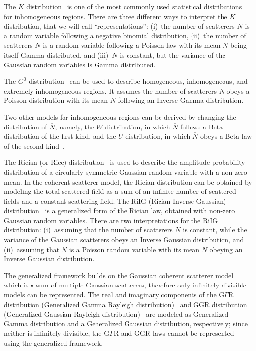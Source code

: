 \documentclass[journal]{IEEEtran}
\begin{document}
The $K$ distribution~\cite{Jakeman:1999} is one of the most commonly used statistical distributions for inhomogeneous regions.
There are three different ways to interpret the $K$ distribution, that we will call ``representations'':
(i)~the number of scatterers $N$ is a random variable following a negative binomial distribution,
(ii)~the number of scatterers $N$ is a random variable following a Poisson law with its mean $\overline{N}$ being itself Gamma distributed, and
(iii)~$N$ is constant, but the variance of the Gaussian random variables is Gamma distributed.

The $G^0$ distribution~\cite{Frery:1997} can be used to describe homogeneous, inhomogeneous, and extremely inhomogeneous regions.
It assumes the number of scatterers $N$ obeys a Poisson distribution with its mean $\overline{N}$ following an Inverse Gamma distribution.

Two other models for inhomogeneous regions can be derived by changing the distribution of $\overline{N}$, namely, the $W$ distribution, in which $\overline{N}$ follows a Beta distribution of the first kind, and the $U$ distribution, in which $\overline{N}$ obeys a Beta law of the second kind~\cite{Delignon:2002}.

The Rician (or Rice) distribution~\cite{Goodman:2007} is used to describe the amplitude probability distribution of a circularly symmetric Gaussian random variable with a non-zero mean.
In the coherent scatterer model, the Rician distribution can be obtained by modeling the total scattered field as a sum of an infinite number of scattered fields and a constant scattering field.
The RiIG (Rician Inverse Gaussian) distribution~\cite{Eltoft:2005} is a generalized form of the Rician law, obtained with non-zero Gaussian random variables.
There are two interpretations for the RiIG distribution:
(i)~assuming that the number of scatterers $N$ is constant, while the variance of the Gaussian scatterers obeys an Inverse Gaussian distribution, and
(ii)~assuming that $N$ is a Poisson random variable with its mean $\overline{N}$ obeying an Inverse Gaussian distribution.

The generalized framework builds on the Gaussian coherent scatterer model which is a sum of multiple Gaussian scatterers, therefore only infinitely divisible models can be represented.
The real and imaginary components of the G$\Gamma$R distribution (Generalized Gamma Rayleigh distribution)~\cite{Li:2010,Li:2011} and GGR distribution (Generalized Gaussian Rayleigh distribution)~\cite{Moser:2006} are modeled as Generalized Gamma distribution and a Generalized Gaussian distribution, respectively; since neither is infinitely divisible, the G$\Gamma$R and GGR laws cannot be represented using the generalized framework.
\end{document}
